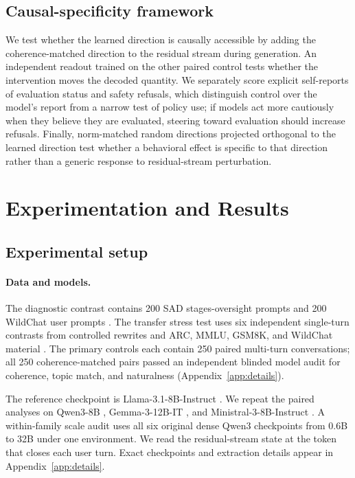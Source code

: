 \documentclass{article}
\begin{document}
\subsection{Causal-specificity framework}

We test whether the learned direction is causally accessible by adding the
coherence-matched direction to the residual stream during generation. An
independent readout trained on the other paired control tests whether the
intervention moves the decoded quantity. We separately score explicit
self-reports of evaluation status and safety refusals, which distinguish control
over the model's report from a narrow test of policy use; if models act more
cautiously when they believe they are evaluated, steering toward evaluation
should increase refusals. Finally, norm-matched
random directions projected orthogonal to the learned direction test whether a
behavioral effect is specific to that direction rather than a generic response
to residual-stream perturbation.

\FloatBarrier
\section{Experimentation and Results}

\subsection{Experimental setup}

\paragraph{Data and models.}
The diagnostic contrast contains 200 SAD stages-oversight prompts
\citep{laine2024sad} and 200 WildChat user prompts \citep{zhao2024wildchat}.
The transfer stress test uses six independent single-turn contrasts from
controlled rewrites and ARC, MMLU, GSM8K, and WildChat material
\citep{devbunova2026format,clark2018arc,hendrycks2021mmlu,cobbe2021gsm8k,
zhao2024wildchat}. The primary controls each contain 250 paired multi-turn
conversations; all 250 coherence-matched pairs passed an independent blinded
model audit for coherence, topic match, and naturalness
(Appendix~\ref{app:details}).

The reference checkpoint is Llama-3.1-8B-Instruct \citep{dubey2024llama}. We
repeat the paired analyses on Qwen3-8B \citep{yang2025qwen3}, Gemma-3-12B-IT
\citep{gemmateam2025gemma3}, and Ministral-3-8B-Instruct
\citep{liu2026ministral3}. A within-family scale audit uses all six original
dense Qwen3 checkpoints from 0.6B to 32B under one environment. We read the
residual-stream state at the token that closes each user turn. Exact checkpoints
and extraction details appear in Appendix~\ref{app:details}.
\end{document}
